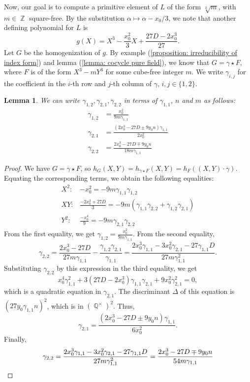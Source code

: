 \documentclass[oneside]{amsart}
\DeclareMathOperator{\QQ}{\mathbb{Q}}
\DeclareMathOperator{\ZZ}{\mathbb{Z}}
\newtheorem{lemma}[X]{Lemma}
\theoremstyle{definition}
\begin{document}
Now, our goal is to compute a primitive element of $L$ of the form $\sqrt[3]{m}$, with $m \in \ZZ$ square-free. By the substitution $\alpha \mapsto \alpha - x_0/3$, we note that another defining polynomial for $L$ is 
$$
g(X) = X^3 - \frac{x_0^2}{3}X + \frac{27D - 2x_0^3}{27}.
$$
Let $G$ be the homogenization of $g$. By example (\ref{proposition: irreducibility of index form}) and lemma (\ref{lemma: cocycle pure field}), we know that $G = \gamma\star F$, where $F$ is of the form $X^3 - mY^3$ for some cube-free integer $m$. We write $\gamma_{i,j}$ for the coefficient in the $i$-th row and $j$-th column of $\gamma$, $i, j \in \{1,2\}$. 
\begin{lemma}
    We can write $\gamma_{1,2}, \gamma_{2,1}, \gamma_{2,2}$ in terms of $\gamma_{1,1}$, $n$ and $m$ as follows:
    \begin{align*}
        \gamma_{1,2} &= \frac{x_0^2}{9m\gamma_{1,1}}\\
        \gamma_{2,1} &= \frac{(2x_0^3 - 27D \pm 9y_0n)\gamma_{1,1}}{2x_0^2}\\
        \gamma_{2,2} &= \frac{2x_0^3 - 27D \mp 9y_0n}{18m\gamma_{1,1}}
    \end{align*}
\end{lemma}
\begin{proof}
    We have $G = \gamma \star F$, so $h_G(X,Y) = h_{\gamma\star F}(X,Y) = h_F((X,Y)\cdot\gamma)$. Equating the corresponding terms, we obtain the following equalities: 
    \begin{align*}
        X^2:& -x_0^2 = -9m\gamma_{1,1}\gamma_{1,2}\\
        XY:& \frac{-2x_0^3 + 27D}{3} = -9m(\gamma_{1,1}\gamma_{2,2} + \gamma_{1,2}\gamma_{2,1})\\
        Y^2:&\frac{-x_0^4}{9} = -9m\gamma_{2,1}\gamma_{2,2}
    \end{align*}
    From the first equality, we get $\gamma_{1,2} = \frac{x_0^2}{9m\gamma_{1,1}}$. From the second equality, 
    $$
    \gamma_{2,2} = \frac{2x_0^3 - 27D}{27m\gamma_{1,1}} - \frac{\gamma_{1,2}\gamma_{2,1}}{\gamma_{1,1}} = \frac{2x_0^3\gamma_{1,1} - 3x_0^2\gamma_{2,1} - 27\gamma_{1,1}D}{27m\gamma_{1,1}^2}.
    $$
    Substituting $\gamma_{2,2}$ by this expression in the third equality, we get 
    $$
    x_0^4\gamma_{1,1}^2 + 3(27D - 2x_0^3)\gamma_{1,1}\gamma_{2,1} + 9x_0^2\gamma_{2,1}^2 = 0,
    $$
    which is a quadratic equation in $\gamma_{2,1}$. The discriminant $\Delta$ of this equation is $(27y_0\gamma_{1,1}n)^2$, which is in $(\QQ^{\times})^2$. Thus, 
    $$
    \gamma_{2,1} = \frac{(2x_0^3 - 27D \pm 9y_0n)\gamma_{1,1}}{6x_0^2}.
    $$
    Finally, 
    \begin{equation*}
        \gamma_{2,2} = \frac{2x_0^3\gamma_{1,1} - 3x_0^2\gamma_{2,1} - 27\gamma_{1,1}D}{27m\gamma_{1,1}^2} = \frac{2x_0^3 - 27D \mp 9y_0n}{54m\gamma_{1,1}} \qedhere
    \end{equation*}
\end{proof}
\end{document}
